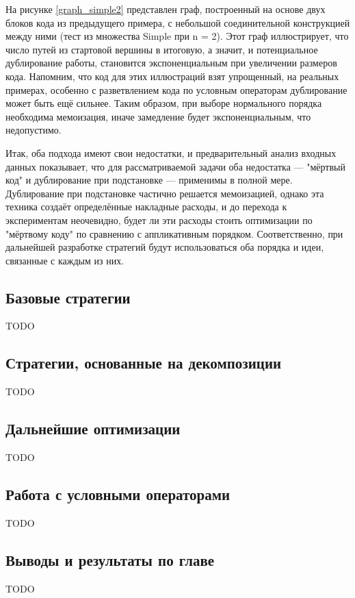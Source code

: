 \documentclass[../diploma.tex]{subfiles}
\begin{document}
На рисунке \ref{graph_simple2} представлен граф, построенный на основе двух блоков кода из предыдущего примера, с небольшой соединительной конструкцией между ними (тест из множества Simple при n = 2). Этот граф иллюстрирует, что число путей из стартовой вершины в итоговую, а значит, и потенциальное дублирование работы, становится экспоненциальным при увеличении размеров кода. Напомним, что код для этих иллюстраций взят упрощенный, на реальных примерах, особенно с разветвлением кода по условным операторам дублирование может быть ещё сильнее. Таким образом, при выборе нормального порядка необходима мемоизация, иначе замедление будет экспоненциальным, что недопустимо.

Итак, оба подхода имеют свои недостатки, и предварительный анализ входных данных показывает, что для рассматриваемой задачи оба недостатка --- "мёртвый код" и дублирование при подстановке --- применимы в полной мере. Дублирование при подстановке частично решается мемоизацией, однако эта техника создаёт определённые накладные расходы, и до перехода к экспериментам неочевидно, будет ли эти расходы стоить оптимизации по "мёртвому коду" по сравнению с аппликативным порядком. Соответственно, при дальнейшей разработке стратегий будут использоваться оба порядка и идеи, связанные с каждым из них.

\subsection{Базовые стратегии}

TODO

\subsection{Стратегии, основанные на декомпозиции}

TODO

\subsection{Дальнейшие оптимизации}

TODO

\subsection{Работа с условными операторами}

TODO

\subsection{Выводы и результаты по главе}

TODO
\end{document}
